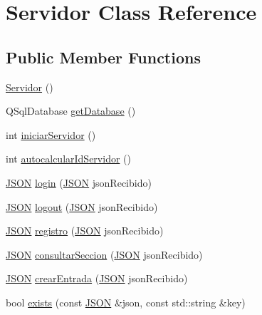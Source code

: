 \hypertarget{classServidor}{}\section{Servidor Class Reference}
\label{classServidor}
\subsection*{Public Member Functions}
\begin{DoxyCompactItemize}
\item 
\mbox{\hyperlink{classServidor_a6be6f59fd470098d8d79bfa22c378b81}{Servidor}} ()
\item 
Q\+Sql\+Database \mbox{\hyperlink{classServidor_ae784cce9d89f9f9ca0804abdb9c3c9d7}{get\+Database}} ()
\item 
int \mbox{\hyperlink{classServidor_a2a7fdca08064f9e567c579a2cb34f267}{iniciar\+Servidor}} ()
\item 
int \mbox{\hyperlink{classServidor_a292f87f595ed2afd654abe3cc5ba8dc0}{autocalcular\+Id\+Servidor}} ()
\item 
\mbox{\hyperlink{classnlohmann_1_1basic__json}{J\+S\+ON}} \mbox{\hyperlink{classServidor_afa99d1a7d42e43c66c066aa8d4622fbf}{login}} (\mbox{\hyperlink{classnlohmann_1_1basic__json}{J\+S\+ON}} json\+Recibido)
\item 
\mbox{\hyperlink{classnlohmann_1_1basic__json}{J\+S\+ON}} \mbox{\hyperlink{classServidor_a612baa3e7a827632a48aacdc024e2a20}{logout}} (\mbox{\hyperlink{classnlohmann_1_1basic__json}{J\+S\+ON}} json\+Recibido)
\item 
\mbox{\hyperlink{classnlohmann_1_1basic__json}{J\+S\+ON}} \mbox{\hyperlink{classServidor_adc19f6be9f624330db206a9d98c981a5}{registro}} (\mbox{\hyperlink{classnlohmann_1_1basic__json}{J\+S\+ON}} json\+Recibido)
\item 
\mbox{\hyperlink{classnlohmann_1_1basic__json}{J\+S\+ON}} \mbox{\hyperlink{classServidor_a172605658340719264d589037d2417d8}{consultar\+Seccion}} (\mbox{\hyperlink{classnlohmann_1_1basic__json}{J\+S\+ON}} json\+Recibido)
\item 
\mbox{\hyperlink{classnlohmann_1_1basic__json}{J\+S\+ON}} \mbox{\hyperlink{classServidor_a211b7b43cd2b5d81b1f21413bce9fbf2}{crear\+Entrada}} (\mbox{\hyperlink{classnlohmann_1_1basic__json}{J\+S\+ON}} json\+Recibido)
\item 
bool \mbox{\hyperlink{classServidor_a41f9f66959c43b27d1d13cf4f20eca55}{exists}} (const \mbox{\hyperlink{classnlohmann_1_1basic__json}{J\+S\+ON}} \&json, const std\+::string \&key)
\end{DoxyCompactItemize}


